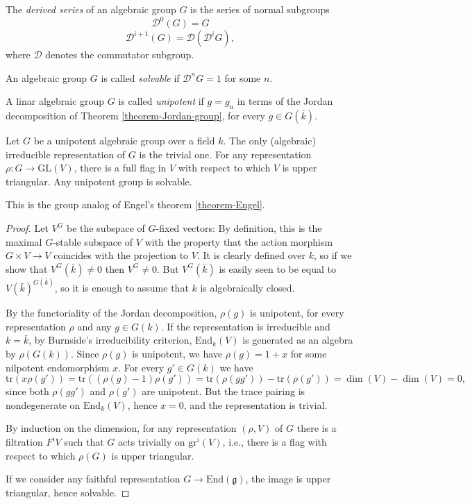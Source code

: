 \begin{definition}
 \label{definition-solvable-unipotent}
The {\it derived series} of an algebraic group $G$ is the series of normal subgroups 
$$ \mathcal D^0(G) = G$$
$$ \mathcal D^{i+1}(G) = \mathcal D(\mathcal D^iG),$$
where $\mathcal D$ denotes the commutator subgroup. 

An algebraic group $G$ is called \emph{solvable} if $\mathcal D^n G=1$ for some $n$. 

A linar algebraic group $G$ is called \emph{unipotent} if $g = g_u$ in terms of the Jordan decomposition of Theorem \ref{theorem-Jordan-group}, for every $g\in G(\bar k)$.
\end{definition}

\begin{theorem}
\label{theorem-representations-unipotent}
Let $G$ be a unipotent algebraic group over a field $k$. The only (algebraic) irreducible representation of $G$ is the trivial one. For any representation $\rho:G \to \text{GL}(V)$, there is a full flag in $V$ with respect to which $V$ is upper triangular. Any unipotent group is solvable.
\end{theorem}

This is the group analog of Engel's theorem \ref{theorem-Engel}.

\begin{proof}
Let $V^G$ be the subspace of $G$-fixed vectors: By definition, this is the maximal $G$-stable subspace of $V$ with the property that the action morphism $G\times V\to V$ coincides with the projection to $V$. It is clearly defined over $k$, so if we show that $V^G(\bar k) \ne 0$ then $V^G\ne 0$. But $V^G(\bar k)$ is easily seen to be equal to $V(\bar k)^{G(\bar k)}$, so it is enough to assume that $k$ is algebraically closed. 

By the functoriality of the Jordan decomposition, $\rho(g)$ is unipotent, for every representation $\rho$ and any $g\in G(k)$. If the representation is irreducible and $k = \bar k$, by Burnside's irreducibility criterion, $\text{End}_k(V)$ is generated as an algebra by $\rho(G(k))$. Since $\rho(g)$ is unipotent, we have $\rho(g) = 1+x$ for some nilpotent endomorphism $x$. For every $g'\in G(k)$ we have 
$$ \text{tr}(x\rho(g')) =\text{tr}((\rho(g)-1)\rho(g'))= \text{tr}(\rho(gg'))-\text{tr}(\rho(g')) = \dim(V)-\dim(V)=0,$$
since both $\rho(gg')$ and $\rho(g')$ are unipotent. But the trace pairing is nondegenerate on $\text{End}_k(V)$, hence $x=0$, and the representation is trivial.

By induction on the dimension, for any representation $(\rho,V)$ of $G$ there is a filtration $F^i V$ such that $G$ acts trivially on $\text{gr}^i(V)$, i.e., there is a flag with respect to which $\rho(G)$ is upper triangular.

If we consider any faithful representation $G\to \text{End}(\mathfrak g)$, the image is upper triangular, hence solvable.
\end{proof}

